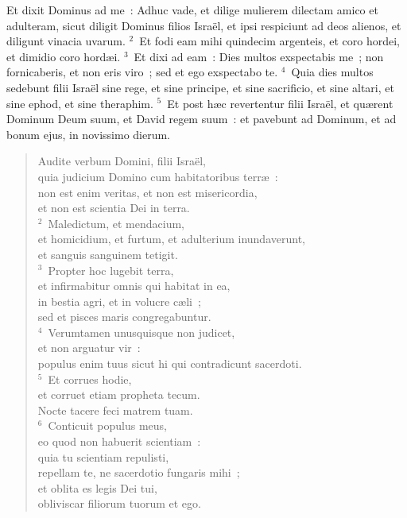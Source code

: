 \lettrine[lines=3,image=true,loversize=0.05,lraise=-0.03]{E}{}t dixit Dominus ad me~: Adhuc vade, et dilige mulierem dilectam amico et adulteram, sicut diligit Dominus filios Isra\"el, et ipsi respiciunt ad deos alienos, et diligunt vinacia uvarum.
${}^{2}$~Et fodi eam mihi quindecim argenteis, et coro hordei, et dimidio coro hord\ae i.
${}^{3}$~Et dixi ad eam~: Dies multos exspectabis me~; non fornicaberis, et non eris viro~; sed et ego exspectabo te.
${}^{4}$~Quia dies multos sedebunt filii Isra\"el sine rege, et sine principe, et sine sacrificio, et sine altari, et sine ephod, et sine theraphim.
${}^{5}$~Et post h\ae c revertentur filii Isra\"el, et qu\ae rent Dominum Deum suum, et David regem suum~: et pavebunt ad Dominum, et ad bonum ejus, in novissimo dierum.
\begin{flushleft}\begin{verse}\vspace{-19pt}Audite verbum Domini, filii Isra\"el,\\ quia judicium Domino cum habitatoribus terr\ae~:\\ non est enim veritas, et non est misericordia,\\ et non est scientia Dei in terra.\\
${}^{2}$~Maledictum, et mendacium,\\ et homicidium, et furtum, et adulterium inundaverunt,\\ et sanguis sanguinem tetigit.\\
${}^{3}$~Propter hoc lugebit terra,\\ et infirmabitur omnis qui habitat in ea,\\ in bestia agri, et in volucre c\ae li~;\\ sed et pisces maris congregabuntur.\\
${}^{4}$~Verumtamen unusquisque non judicet,\\ et non arguatur vir~:\\ populus enim tuus sicut hi qui contradicunt sacerdoti.\\
${}^{5}$~Et corrues hodie,\\ et corruet etiam propheta tecum.\\ Nocte tacere feci matrem tuam.\\
${}^{6}$~Conticuit populus meus,\\ eo quod non habuerit scientiam~:\\ quia tu scientiam repulisti,\\ repellam te, ne sacerdotio fungaris mihi~;\\ et oblita es legis Dei tui,\\ obliviscar filiorum tuorum et ego.\\

\end{verse}
\end{flushleft}
